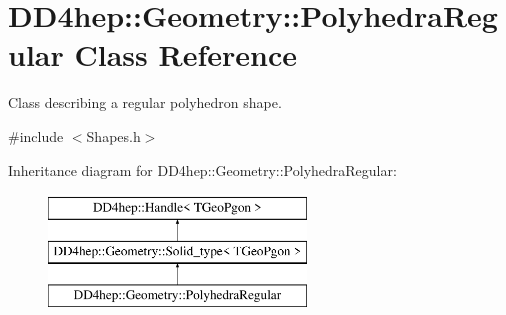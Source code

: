 \hypertarget{class_d_d4hep_1_1_geometry_1_1_polyhedra_regular}{}\section{D\+D4hep\+:\+:Geometry\+:\+:Polyhedra\+Regular Class Reference}
\label{class_d_d4hep_1_1_geometry_1_1_polyhedra_regular}


Class describing a regular polyhedron shape.  




{\ttfamily \#include $<$Shapes.\+h$>$}

Inheritance diagram for D\+D4hep\+:\+:Geometry\+:\+:Polyhedra\+Regular\+:\begin{figure}[H]
\begin{center}
\leavevmode
\includegraphics[height=3.000000cm]{class_d_d4hep_1_1_geometry_1_1_polyhedra_regular}
\end{center}
\end{figure}
